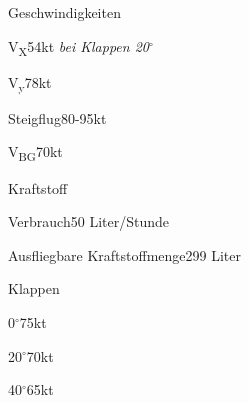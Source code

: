 \begin{task}
  \begin{checklist}{Geschwindigkeiten}
    \item{V\textsubscript{X}}{54kt \textit{bei Klappen 20$^{\circ}$}}
    \item{V\textsubscript{y}}{78kt}
    \item{Steigflug}{80-95kt}
    \item{V\textsubscript{BG}}{70kt}
  \end{checklist}
  \begin{checklist}{Kraftstoff}
    \item{Verbrauch}{50 Liter/Stunde}
    \item{Ausfliegbare Kraftstoffmenge}{299 Liter}
  \end{checklist}
  \begin{checklist}{Klappen}
    \item{0$^{\circ}$}{75kt}
    \item{20$^{\circ}$}{70kt}
    \item{40$^{\circ}$}{65kt}
  \end{checklist}
\end{task}
